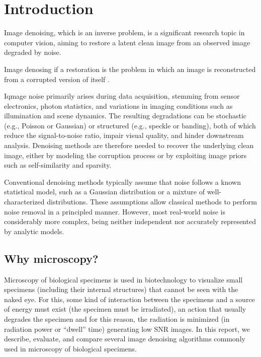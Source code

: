\chapter{Introduction}

Image denoising, which is an inverse problem, is a significant
research topic in computer vision, aiming to restore a latent clean
image from an observed image degraded by
noise. %


Image denosing if a restoration is the problem in which an image is
reconstructed from a corrupted version of itself
\cite{BUCHHOLZ2019277}.

Iqmage noise primarily arises during data acquisition, stemming from
sensor electronics, photon statistics, and variations in imaging
conditions such as illumination and scene dynamics. The resulting
degradations can be stochastic (e.g., Poisson or Gaussian) or
structured (e.g., speckle or banding), both of which reduce the
signal-to-noise ratio, impair visual quality, and hinder downstream
analysis. Denoising methods are therefore needed to recover the
underlying clean image, either by modeling the corruption process or
by exploiting image priors such as self-similarity and
sparsity. %

Conventional denoising methods typically assume that noise follows a
known statistical model, such as a Gaussian distribution or a mixture
of well-characterized distributions. These assumptions allow
classical methods to perform noise removal in a principled
manner. However, most real-world noise is considerably more complex,
being neither independent nor accurately represented by analytic
models.  %

\section{Why microscopy?}
Microscopy of biological specimens is used in biotechnology to
visualize small specimens (including their internal structures) that
cannot be seen with the naked eye. For this, some kind of interaction
between the specimens and a source of energy must exist (the specimen
must be irradiated), an action that usually degrades the specimen and
for this reason, the radiation is minimized (in radiation power or
``dwell'' time) generating low SNR images. In this report, we describe,
evaluate, and compare several image denoising algorithms commonly used
in microscopy of biological specimens.


